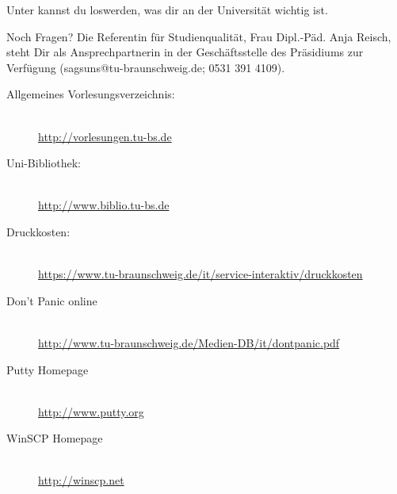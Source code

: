 Unter  kannst du loswerden, was dir an der Universität wichtig ist.

Noch Fragen? Die Referentin für Studienqualität, Frau Dipl.-Päd. Anja Reisch, steht Dir als Ansprechpartnerin in der Geschäftsstelle des Präsidiums zur Verfügung (sagsuns@tu-braunschweig.de; 0531 391 4109).

\begin{description}
\item[Allgemeines Vorlesungsverzeichnis:] ~\\
{\footnotesize\url{http://vorlesungen.tu-bs.de}}
\item[Uni-Bibliothek:] ~\\
{\footnotesize\url{http://www.biblio.tu-bs.de}}
\item[Druckkosten:] ~\\
{\footnotesize\url{https://www.tu-braunschweig.de/it/service-interaktiv/druckkosten}}
\item[Don't Panic online] ~\\
{\footnotesize\url{http://www.tu-braunschweig.de/Medien-DB/it/dontpanic.pdf}}
\item[Putty Homepage] ~\\
{\footnotesize\url{http://www.putty.org}}
\item[WinSCP Homepage] ~\\
{\footnotesize\url{http://winscp.net}}
\end{description}

